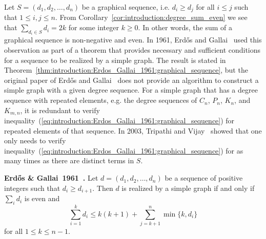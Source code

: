 
Let $S = (d_1, d_2, \dots, d_n)$ be a graphical sequence, i.e.
$d_i \geq d_j$ for all $i \leq j$ such that $1 \leq i, j \leq n$. From
Corollary~\ref{cor:introduction:degree_sum_even} we see that
$\sum_{d_i \in S} d_i = 2k$ for some integer $k \geq 0$. In other
words, the sum of a graphical sequence is non-negative and
even. In 1961, Erd\H{o}s and Gallai~\cite{ErdosGallai1960} used this
observation as part of a theorem that provides necessary and
sufficient conditions for a sequence to be realized by a simple
graph. The result is stated in
Theorem~\ref{thm:introduction:Erdos_Gallai_1961:graphical_sequence},
but the original paper of Erd\H{o}s and Gallai~\cite{ErdosGallai1960}
does not provide an algorithm to construct a simple graph with a given
degree sequence. For a simple graph that has a degree sequence with
repeated elements, e.g. the degree sequences of $C_n$, $P_n$, $K_n$,
and $K_{m,n}$, it is redundant to verify
inequality~(\ref{eq:introduction:Erdos_Gallai_1961:graphical_sequence})
for repeated elements of that sequence. In 2003, Tripathi and
Vijay~\cite{TripathiVijay2003} showed that one only needs to verify
inequality~(\ref{eq:introduction:Erdos_Gallai_1961:graphical_sequence})
for as many times as there are distinct terms in $S$.

\begin{theorem}
\label{thm:introduction:Erdos_Gallai_1961:graphical_sequence}
\textbf{Erd\H{o}s \& Gallai~1961~\cite{ErdosGallai1960}.}
Let $d = (d_1, d_2, \dots, d_n)$ be a sequence of positive integers
such that $d_i \geq d_{i+1}$. Then $d$ is realized by a simple graph
if and only if $\sum_i d_i$ is even and
%
\begin{equation}
\label{eq:introduction:Erdos_Gallai_1961:graphical_sequence}
\sum_{i=1}^k d_i
\leq
k(k + 1) + \sum_{j=k+1}^n \min\{k, d_i\}
\end{equation}
%
for all $1 \leq k \leq n - 1$.
\end{theorem}

